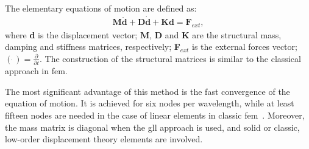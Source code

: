 The elementary equations of motion are defined as:
\begin{eqnarray}
	\label{eq:motion}
	\textbf{M} \ddot{\textbf{d}} + \textbf{D} \dot{\textbf{d}} + \textbf{K} \textbf{d} = \textbf{F}_{ext},
\end{eqnarray}
where \textbf{d} is the displacement vector; \textbf{M}, \textbf{D} and \textbf{K} are the structural mass, damping and stiffness matrices, respectively; \textbf{F}$_{ext}$ is the external forces vector; \((\dot{\ })=\frac{\partial}{\partial t}\). 
The construction of the structural matrices is similar to the classical approach in \ac{fem}.

The most significant advantage of this method is the fast convergence of the equation of motion.
It is achieved for six nodes per wavelength, while at least fifteen nodes are needed in the case of linear elements in classic \ac{fem}~\cite{wee2017simulating}.
Moreover, the mass matrix is diagonal when the \ac{gll} approach is used, and solid or classic, low-order displacement theory elements are involved.
